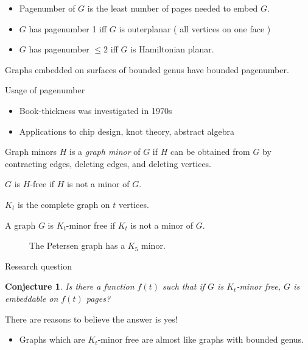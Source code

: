 \documentclass[]{beamer}
\newtheorem{conjecture}[theorem]{Conjecture}
\begin{document}
\begin{frame}
	\begin{itemize}
		\item Pagenumber of $G$ is the least number of pages needed to embed $G$.
		\item $G$ has pagenumber 1 iff $G$ is outerplanar ( all vertices on one face )
		\item $G$ has pagenumber $\leq 2$ iff $G$ is Hamiltonian planar.
	\end{itemize}

	\begin{theorem}
		Graphs embedded on surfaces of bounded genus have bounded pagenumber.
	\end{theorem}
\end{frame}

\begin{frame}{Usage of pagenumber}
	\begin{itemize}
		\item Book-thickness was investigated in 1970s
		\item Applications to chip design, knot theory, abstract algebra
	\end{itemize}
\end{frame}

\begin{frame}{Graph minors}
	$H$ is a \textit{graph minor} of $G$ if $H$ can be obtained from $G$ by contracting edges, deleting edges, and deleting vertices.
	
	$G$ is $H$-free if $H$ is not a minor of $G$. 
\end{frame}

\begin{frame}
	$K_t$ is the complete graph on $t$ vertices.
	\begin{definition}
		A graph $G$ is $K_t$-minor free if $K_t$ is not a minor of $G$.
	\end{definition}
	\begin{figure}[h]
		\centering
		
		
		\caption{The Petersen graph has a $K_5$ minor.}\label{P10contraction}
	\end{figure}
\end{frame}

\begin{frame}{Research question}
	\begin{conjecture}
		Is there a function $f(t)$ such that if $G$ is $K_t$-minor free, $G$ is embeddable on $f(t)$ pages?
	\end{conjecture}
	There are reasons to believe the answer is yes!
	\begin{itemize}
		\item Graphs which are $K_t$-minor free are almost like graphs with bounded genus.
	\end{itemize}
\end{frame}
\end{document}
